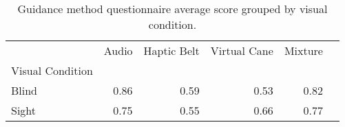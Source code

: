 
\begin{table}[!htb]
\centering
\caption{Guidance method questionnaire average score grouped by visual condition.}
\label{tab:questionnaire_average_group}
\begin{tabular}{lrrrrr}
\toprule
{} & Audio & Haptic Belt & Virtual Cane & Mixture \\
Visual Condition &       &             &              &         \\
\midrule
Blind            &  0.86 &        0.59 &         0.53 &    0.82 \\
Sight            &  0.75 &        0.55 &         0.66 &    0.77 \\
\bottomrule
\end{tabular}
\end{table}


